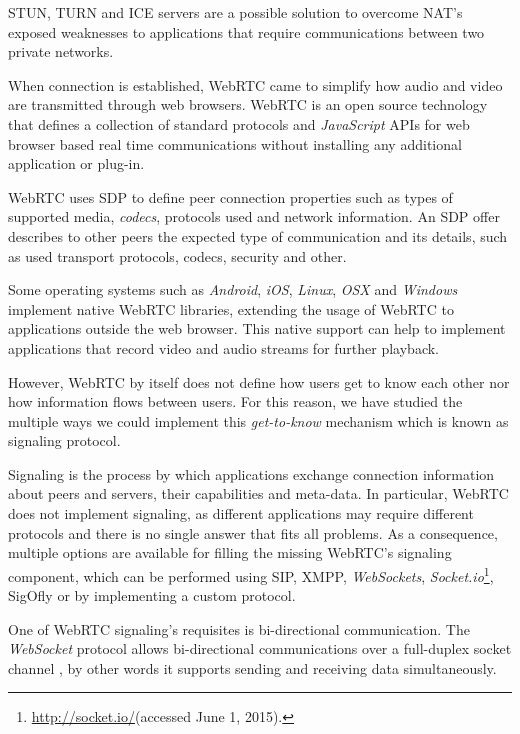 \documentclass[conference,compsoc,a4paper]{IEEEtran}
\begin{document}
\gls{STUN}, \gls{TURN} and \gls{ICE} \cite{natvoip} servers are a possible solution to overcome \gls{NAT}'s exposed weaknesses to applications that require communications between two private networks. 


When connection is established, \gls{WebRTC} came to simplify how audio and video are transmitted through web browsers. \gls{WebRTC} is an open source technology that defines a collection of standard protocols and \emph{JavaScript} \gls{API}s for web browser based real time communications without installing any additional application or plug-in. 

\gls{WebRTC} uses \gls{SDP} \cite{rfc4566} to define peer connection properties such as types of supported media, \emph{codecs}, protocols used and network information. An \gls{SDP} offer describes to other peers the expected type of communication and its details, such as used transport protocols, codecs, security and other.


Some operating systems such as \emph{Android}, \emph{iOS}, \emph{Linux}, \emph{OSX} and \emph{Windows} implement native \gls{WebRTC} libraries, extending the usage of \gls{WebRTC} to applications outside the web browser. This native support can help to implement applications that record video and audio streams for further playback.

However, \gls{WebRTC} by itself does not define how users get to know each other nor how information flows between users. For this reason, we have studied the multiple ways we could implement this \emph{get-to-know} mechanism which is known as signaling protocol.


  Signaling is the process by which applications exchange connection information about peers and servers, their capabilities and meta-data.
  In particular, \gls{WebRTC} does not implement signaling, as different applications may require different protocols and there is no single answer that fits all problems.
  As a consequence, multiple options are available for filling the missing \gls{WebRTC}'s signaling component, which can be performed using \gls{SIP}\cite{rfc3261}, \gls{XMPP}, \emph{WebSockets}, \emph{Socket.io}\footnote{\url{http://socket.io/}(accessed June 1, 2015).}, \gls{SigOfly}\cite{sigofly} or by implementing a custom protocol.

  One of \gls{WebRTC} signaling's requisites is bi-directional communication. The \emph{WebSocket} protocol allows bi-directional communications over a full-duplex socket channel \cite{rfc6455}, by other words it supports sending and receiving data simultaneously.
\end{document}
